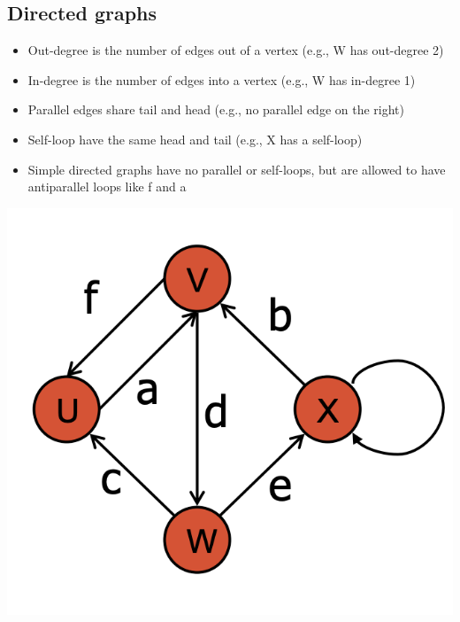 \documentclass[12pt]{article}
\newcommand{\1}{\space \quad}
\newcommand{\2}{\quad \quad \quad}
\newcommand{\3}{\quad \quad \quad \quad \space}
\newcommand{\4}{\quad \quad \quad \quad \quad \quad}
\newcommand{\5}{\quad \quad \quad \quad \quad \quad \quad \space}
\begin{document}
\subsection{Directed graphs}
\begin{minipage}[l]{0.6\textwidth}
  \begin{itemize}
    \item Out-degree is the number of edges out of a vertex (e.g., W has out-degree 2)
    \item In-degree is the number of edges into a vertex (e.g., W has in-degree 1)
    \item Parallel edges share tail and head (e.g., no parallel edge on the right)
    \item Self-loop have the same head and tail (e.g., X has a self-loop)
    \item Simple directed graphs have no parallel or self-loops, but are allowed to have antiparallel loops like f and a
  \end{itemize}
\end{minipage}
\begin{minipage}[r]{0.39\textwidth}
  \raggedleft
  \includegraphics[width=\textwidth]{image17.png}
\end{minipage}
\end{document}
